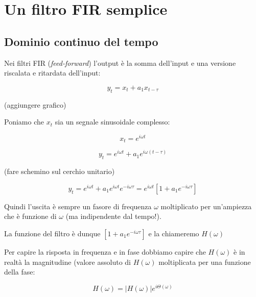 %
%

\section{Un filtro FIR semplice\label{sec:simple fir}}

\subsection{Dominio continuo del tempo\label{sec:continuous time}}

Nei filtri FIR (\emph{feed-forward}) l'output \`e la somma dell'input e una versione riscalata e ritardata
		dell'input:

		\begin{equation}\label{eqn:fir semplice}
						y_t = x_t + a_1 x_{t-\tau}
			\end{equation}

		(aggiungere grafico)

	Poniamo che $x_t$ sia un segnale sinusoidale complesso:

		 \begin{equation}
	    x_t = e^{i\omega t}\nonumber
		 \end{equation}

		 \begin{equation}
			y_t = e^{i \omega t} + a_1 e^{i \omega (t - \tau)}
		 \end{equation}

		(fare schemino sul cerchio unitario)

		 \begin{equation}
		  y_t = e^{i \omega t} + a_1 e^{i \omega t} e^{-i \omega \tau} = e^{i\omega t} \left [ 1 + a_1 e^{-i \omega \tau} \right ]
		 \end{equation}

	Quindi l'uscita \`e sempre un fasore di frequenza $\omega$ moltiplicato per
		un'ampiezza che \`e funzione di $\omega$ (ma indipendente dal tempo!).

	La funzione del filtro \`e dunque $\left [ 1 + a_1 e^{-i \omega \tau} \right ]$ e la chiameremo $H(\omega)$

	Per capire la risposta in frequenza e in fase dobbiamo capire che $H(\omega)$ \`e
		in realt\`a la magnitudine (valore assoluto di $H(\omega)$ moltiplicata per una
		funzione della fase:

		 \begin{equation}
		  H(\omega) = |H(\omega)| e^{i \Theta(\omega)}
		 \end{equation}

